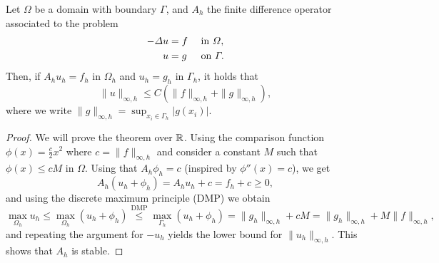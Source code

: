\begin{theorem}
    Let $\Omega$ be a domain with boundary $\Gamma$, and $A_h$ the finite difference operator associated to the problem
    \begin{equation}
        \begin{aligned}
            -\Delta u &= f && \text{ in } \Omega, \\
            u &= g && \text{ on } \Gamma.
        \end{aligned}
    \end{equation}
    Then, if $A_h u_h = f_h$ in $\Omega_h$ and $u_h = g_h$ in $\Gamma_h$, it holds that
    \begin{equation}
        \|u\|_{\infty,h} \leq C\left(\|f\|_{\infty, h} + \|g\|_{\infty, h}\right),
    \end{equation}
    where we write $\|g\|_{\infty, h} = \sup_{x_i\in\Gamma_h}|g(x_i)|$. 
    \begin{proof}
        We will prove the theorem over $\mathbb{R}$. Using the comparison function $\phi(x) = \frac{c}{2}x^2$ where $c=\|f\|_{\infty, h}$ and consider a constant $M$ such that $\phi(x) \leq cM$ in $\Omega$. Using that $A_h \phi_h = c$ (inspired by $\phi''(x) = c$), we get
        \begin{equation*}
            A_h(u_h + \phi_h) = A_h u_h + c = f_h + c \geq 0,
        \end{equation*}
        and using the discrete maximum principle (DMP) we obtain
        \begin{equation*}
            \max_{\Omega_h} u_h \leq \max_{\Omega_h} (u_h + \phi_h) \overset{\text{DMP}}{\leq} \max_{\Gamma_h} (u_h + \phi_h) = \|g_h\|_{\infty, h} + cM = \|g_h\|_{\infty, h} + M \|f\|_{\infty, h},
        \end{equation*}
        and repeating the argument for $-u_h$ yields the lower bound for $\|u_h\|_{\infty,h}$. This shows that $A_h$ is stable.
    \end{proof}
\end{theorem}


